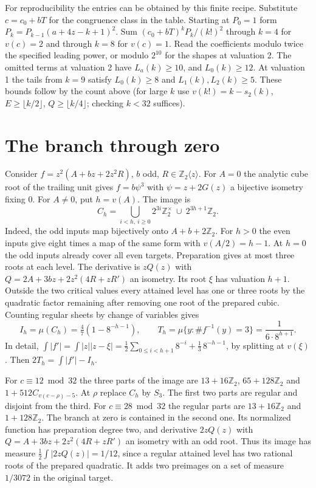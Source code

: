 \documentclass[11pt]{article}
\newcommand{\Z}{\mathbb Z_2}
\newcommand{\U}{\mathbb Z_2^\times}
\newcommand{\T}{\mathbb Z_2\langle z\rangle}
\begin{document}
For reproducibility the entries can be obtained by this finite recipe. Substitute $c=c_0+bT$ for the congruence class in the table. Starting at $P_0=1$ form $P_k=P_{k-1}(a+4z-k+1)^2$. Sum $(c_0+bT)^kP_k/(k!)^2$ through $k=4$ for $v(c)=2$ and through $k=8$ for $v(c)=1$. Read the coefficients modulo twice the specified leading power, or modulo $2^{10}$ for the shapes at valuation 2. The omitted terms at valuation 2 have $L_a(k)\ge10$, and $L_0(k)\ge12$. At valuation 1 the tails from $k=9$ satisfy $L_0(k)\ge8$ and $L_1(k),L_2(k)\ge5$. These bounds follow by the count above (for large $k$ use $v(k!)=k-s_2(k)$, $E\ge\lfloor k/2\rfloor$, $Q\ge\lfloor k/4\rfloor$; checking $k<32$ suffices).

\section{The branch through zero}
Consider $f=z^2(A+bz+2z^2R)$, $b$ odd, $R\in\T$. For $A=0$ the analytic cube root of the trailing unit gives $f=b\psi^3$ with $\psi=z+2G(z)$ a bijective isometry fixing 0. For $A\ne0$, put $h=v(A)$. The image is
\[
 C_h=\bigcup_{i<h,\ i\ge0}2^{3i}\U\ \cup\ 2^{3h+1}\Z .
\]
Indeed, the odd inputs map bijectively onto $A+b+2\Z$. For $h>0$ the even inputs give eight times a map of the same form with $v(A/2)=h-1$. At $h=0$ the odd inputs already cover all even targets. Preparation gives at most three roots at each level. The derivative is $zQ(z)$ with $Q=2A+3bz+2z^2(4R+zR')$ an isometry. Its root $\xi$ has valuation $h+1$. Outside the two critical values every attained level has one or three roots by the quadratic factor remaining after removing one root of the prepared cubic. Counting regular sheets by change of variables gives
\[
 I_h=\mu(C_h)=\tfrac47(1-8^{-h-1}),\qquad
 T_h=\mu\{y:\# f^{-1}(y)=3\}=\frac1{6\cdot8^{h+1}} .
\]
In detail, $\int|f'|=\int|z||z-\xi|
=\tfrac12\sum_{0\le i<h+1}8^{-i}+\tfrac13\,8^{-h-1}$,
by splitting at $v(\xi)$. Then $2T_h=\int|f'|-I_h$.

For $c\equiv12\bmod32$ the three parts of the image are
$13+16\Z$, $65+128\Z$ and $1+512 C_{v(c-\rho)-5}$. At $\rho$ replace $C_h$ by $S_3$. The first two parts are regular and disjoint from the third. For $c\equiv28\bmod32$ the regular parts are $13+16\Z$ and $1+128\Z$. The branch at zero is contained in the second one. Its normalized function has preparation degree two, and derivative $2zQ(z)$ with $Q=A+3bz+2z^2(4R+zR')$ an isometry with an odd root. Thus its image has measure $\tfrac12\int|2zQ(z)|=1/12$, since a regular attained level has two rational roots of the prepared quadratic. It adds two preimages on a set of measure $1/3072$ in the original target.
\end{document}
